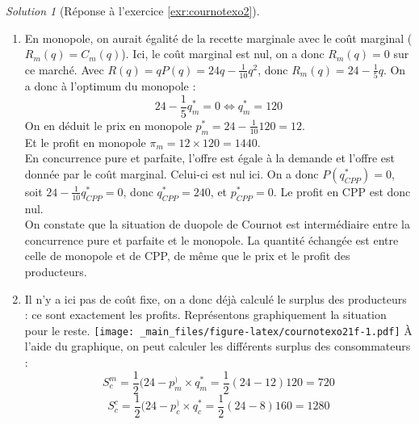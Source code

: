 \documentclass[
]{book}
\theoremstyle{definition}
\theoremstyle{definition}
\theoremstyle{definition}
\theoremstyle{definition}
\theoremstyle{remark}
\newtheorem*{solution}{Solution}
\begin{document}
\begin{solution}[Réponse à l'exercice \ref{exr:cournotexo2}]
\begin{enumerate}
\begin{enumerate}
\begin{gather*}
    \end{gather*}
    Pour résoudre ce système, on peut, par exemple, remplacer dans la première expression \(q_B^*\) par son expression dans la deuxième.
    On obtient :
    \begin{gather*}
    q_A^*=120-\frac{1}{2}\left(120-\frac{1}{2}q_A^*\right) \\
    \Leftrightarrow \frac{3}{4}q_A^*=120-60\\
    \Leftrightarrow q_A^*=80
    \end{gather*}
    Par symétrie des entreprises A et B, on obtient immédiatement que \(q_B^*=80\).
    On peut en déduire le prix sur le marché :
    \[p^*=P(q_A^*+q_B^*)=24-\frac{1}{10}(q_A^*+q_B^*)=24-\frac{160}{10}=8\]
    Le profit de la firme A est alors :
    \[\pi_A(q_A^*, q_B^*)=q_A^*\times p^*=8*80=640\]
    Il en est de même pour l'entreprise B.
    Le profit total en duopole est donc \(1280\).
  \item
    En monopole, on aurait égalité de la recette marginale avec le coût marginal (\(R_m(q)=C_m(q)\)).
    Ici, le coût marginal est nul, on a donc \(R_m(q)=0\) sur ce marché.
    Avec \(R(q)=qP(q)=24q-\frac{1}{10}q^2\), donc \(R_m(q)=24-\frac{1}{5}q\).
    On a donc à l'optimum du monopole :
    \[24-\frac{1}{5}q^*_m=0\Leftrightarrow q_m^*=120\]
    On en déduit le prix en monopole \(p_m^*=24-\frac{1}{10}120=12\).\\
    Et le profit en monopole \(\pi_m=12\times 120=1440\).\\
    En concurrence pure et parfaite, l'offre est égale à la demande et l'offre est donnée par le coût marginal.
    Celui-ci est nul ici.
    On a donc \(P(q^*_{CPP})=0\), soit \(24-\frac{1}{10}q^*_{CPP}=0\), donc \(q_{CPP}^*=240\), et \(p_{CPP}^*=0\).
    Le profit en CPP est donc nul.\\
    On constate que la situation de duopole de Cournot est intermédiaire entre la concurrence pure et parfaite et le monopole.
    La quantité échangée est entre celle de monopole et de CPP, de même que le prix et le profit des producteurs.
  \item
    Il n'y a ici pas de coût fixe, on a donc déjà calculé le surplus des producteurs : ce sont exactement les profits.
    Représentons graphiquement la situation pour le reste.
    \texttt{[image: \_main\_files/figure-latex/cournotexo21f-1.pdf]}
    À l'aide du graphique, on peut calculer les différents surplus des consommateurs :
    \[S_c^m=\frac{1}{2}(24-p_m^)\times q_m^*=\frac{1}{2}(24-12)120=720\]
    \[S_c^c=\frac{1}{2}(24-p_c^)\times q_c^*=\frac{1}{2}(24-8)160=1280\]

\end{enumerate}
\end{enumerate}
\end{solution}
\end{document}

